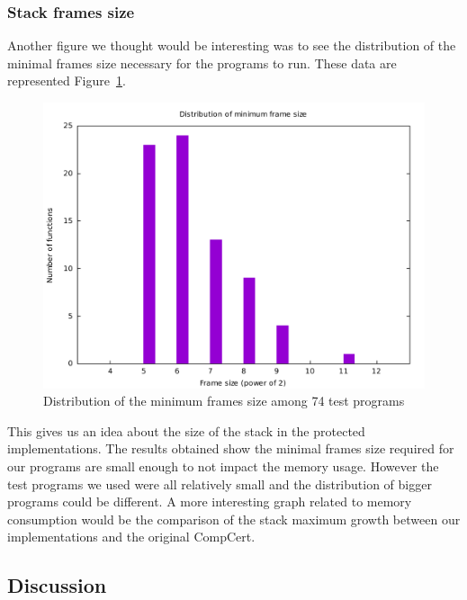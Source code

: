 \documentclass[11pt]{sdm}
\begin{document}
\subsubsection{Stack frames size}
\label{ssub:Stack frames size}

Another figure we thought would be interesting was to see the distribution of the minimal frames size necessary for the programs to run. These data are represented Figure~\ref{frame_size_graph}.

\begin{figure}[!ht]
\centering
\includegraphics[width=1\textwidth]{images/frame_size_graph.pdf}
\caption{Distribution of the minimum frames size among 74 test programs}
\label{frame_size_graph}
\end{figure}

This gives us an idea about the size of the stack in the protected implementations. The results obtained show the minimal frames size required for our programs are small enough to not impact the memory usage. However the test programs we used were all relatively small and the distribution of bigger programs could be different.
A more interesting graph related to memory consumption would be the comparison of the stack maximum growth between our implementations and the original CompCert. 

\subsection{Discussion}
\end{document}
